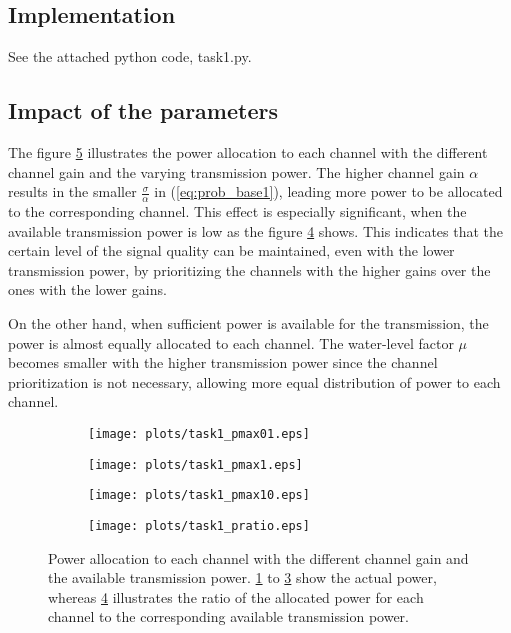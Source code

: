 \documentclass[10pt,a4paper]{article}
\begin{document}
\subsection{Implementation}
See the attached python code, task1.py.

\subsection{Impact of the parameters}
The figure \ref{fig:task1} illustrates the power allocation to each channel with the different channel gain and the varying transmission power. The higher channel gain $\alpha$ results in the smaller $\frac{\sigma}{\alpha}$ in (\ref{eq:prob_base1}), leading more power to be allocated to the corresponding channel. This effect is especially significant, when the available transmission power is low as the figure \ref{fig:task1_pratio} shows. This indicates that the certain level of the signal quality can be maintained, even with the lower transmission power, by prioritizing the channels with the higher gains over the ones with the lower gains. 

On the other hand, when sufficient power is available for the transmission, the power is almost equally allocated to each channel. The water-level factor $\mu$ becomes smaller with the higher transmission power since the channel prioritization is not necessary, allowing more equal distribution of power to each channel. 

\begin{figure}[ht]
	\begin{subfigure}{.5\textwidth}
		\centering
		\texttt{[image: plots/task1\_pmax01.eps]}
		\caption{ }
		\label{fig:task1_pmax01}
	\end{subfigure}
	\begin{subfigure}{.5\textwidth}
		\centering
		\texttt{[image: plots/task1\_pmax1.eps]}
		\caption{ }
		\label{fig:task1_pmax1}
	\end{subfigure}
	\newline
	\begin{subfigure}{.5\textwidth}
		\centering
		\texttt{[image: plots/task1\_pmax10.eps]}
		\caption{ }
		\label{fig:task1_pmax10}
	\end{subfigure}
	\begin{subfigure}{.5\textwidth}
		\centering
		\texttt{[image: plots/task1\_pratio.eps]}
		\caption{ }
		\label{fig:task1_pratio}
	\end{subfigure}
%
\caption{Power allocation to each channel with the different channel gain and the available transmission power. \ref{fig:task1_pmax01} to \ref{fig:task1_pmax10} show the actual power, whereas \ref{fig:task1_pratio} illustrates the ratio of the allocated power for each channel to the corresponding available transmission power.}
\label{fig:task1}
\end{figure}
\end{document}
